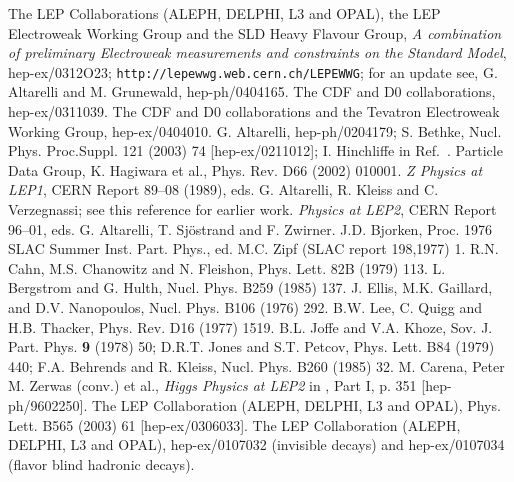  The LEP Collaborations (ALEPH, DELPHI, L3 and OPAL), 
the LEP Electroweak Working Group and the SLD Heavy Flavour Group, {\it A
combination of preliminary Electroweak measurements and constraints on the
Standard Model}, hep-ex/0312O23; {\tt http://lepewwg.web.cern.ch/LEPEWWG};
for an update see, G. Altarelli and M. Grunewald, hep-ph/0404165.
% 
 The CDF and D0 collaborations, hep-ex/0311039.
%
 The CDF and D0 collaborations and the Tevatron 
Electroweak Working Group, hep-ex/0404010.
%
 G. Altarelli, hep-ph/0204179;
S. Bethke, Nucl. Phys. Proc.Suppl. 121 (2003) 74 [hep-ex/0211012];
I. Hinchliffe in Ref.~\cite{PDG}.
%
 Particle Data Group, K. Hagiwara et al., Phys. Rev. D66 
(2002) 010001.
%
 {\it Z Physics at LEP1}, CERN Report 89--08 (1989),
eds. G. Altarelli, R. Kleiss and C. Verzegnassi; see this reference for 
earlier work. 
%
 {\it Physics at LEP2}, CERN Report 96--01, eds. G. 
Altarelli, T. Sj\"ostrand and F. Zwirner.  
%
J.D. Bjorken, Proc. 1976 SLAC Summer Inst. Part. 
Phys., ed. M.C. Zipf (SLAC report 198,1977) 1. 
%
 R.N. Cahn, M.S. Chanowitz and N. Fleishon, Phys. Lett.
82B (1979) 113. 
%
 L. Bergstrom and G. Hulth, Nucl. Phys. B259 (1985) 137.
% 
J. Ellis, M.K. Gaillard, and D.V. Nanopoulos, Nucl. Phys.  B106 (1976) 292.
%
B.W. Lee, C. Quigg and H.B. Thacker, Phys. Rev. D16 (1977) 1519.
%
B.L. Joffe and V.A. Khoze, Sov. J. Part. Phys. {\bf 9} (1978) 50; 
D.R.T. Jones and S.T. Petcov, Phys. Lett. B84 (1979) 440; 
F.A. Behrends and R. Kleiss, Nucl. Phys. B260 (1985) 32.
%
 M. Carena, Peter M. Zerwas (conv.) et al., 
{\it Higgs Physics at LEP2} in \cite{W-Physics}, 
Part I, p. 351 [hep-ph/9602250]. 
%
 The LEP Collaboration (ALEPH, DELPHI, L3 and OPAL), 
Phys. Lett. B565 (2003) 61 [hep-ex/0306033]. 
%
 The LEP Collaboration (ALEPH, DELPHI, L3 and OPAL), 
hep-ex/0107032 (invisible decays) and hep-ex/0107034 (flavor blind hadronic 
decays). 

